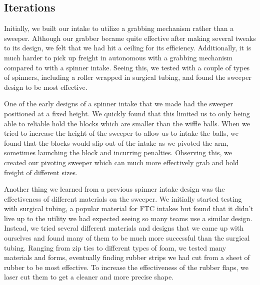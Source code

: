 
\subsection*{Iterations}
Initially, we built our intake to utilize a grabbing mechanism rather than a sweeper. Although our grabber became quite effective after making several tweaks to its design, we felt that we had hit a ceiling for its efficiency. Additionally, it is much harder to pick up freight in autonomous with a grabbing mechanism compared to with a spinner intake. Seeing this, we tested with a couple of types of spinners, including a roller wrapped in surgical tubing, and found the sweeper design to be most effective. 



One of the early designs of a spinner intake that we made had the sweeper positioned at a fixed height. We quickly found that this limited us to only being able to reliable hold the blocks which are smaller than the wiffle balls. When we tried to increase the height of the sweeper to allow us to intake the balls, we found that the blocks would slip out of the intake as we pivoted the arm, sometimes launching the block and incurring penalties. Observing this, we created our pivoting sweeper which can much more effectively grab and hold freight of different sizes.


Another thing we learned from a previous spinner intake design was the effectiveness of different materials on the sweeper. We initially started testing with surgical tubing, a popular material for FTC intakes but found that it didn’t live up to the utility we had expected seeing so many teams use a similar design. Instead, we tried several different materials and designs that we came up with ourselves and found many of them to be much more successful than the surgical tubing. Ranging from zip ties to different types of foam, we tested many materials and forms, eventually finding rubber strips we had cut from a sheet of rubber to be most effective. To increase the effectiveness of the rubber flaps, we laser cut them to get a cleaner and more precise shape.


